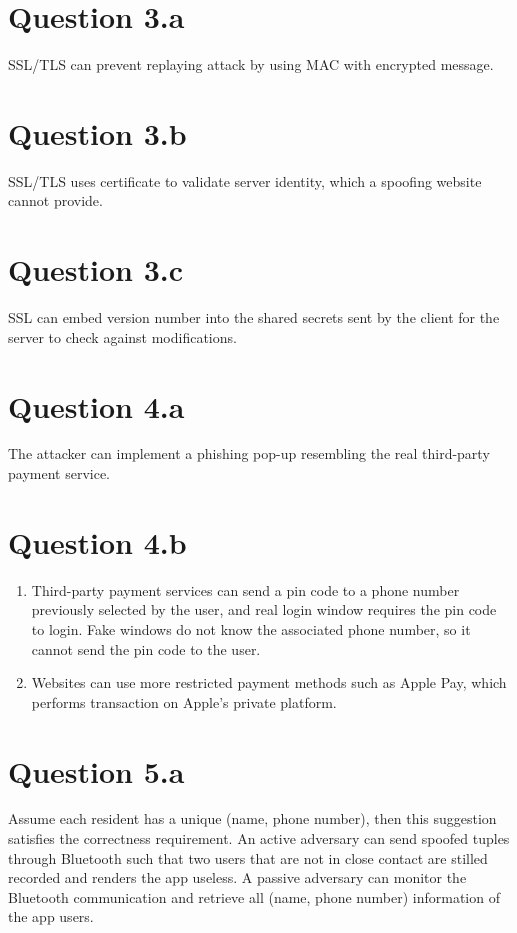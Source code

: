 \documentclass{article}
\begin{document}
\section{Question 3.a}
SSL/TLS can prevent replaying attack by using MAC with encrypted message.
\newpage

\section{Question 3.b}
SSL/TLS uses certificate to validate server identity, which a spoofing website cannot provide.
\newpage

\section{Question 3.c}
SSL can embed version number into the shared secrets sent by the client for the server to check against modifications.
\newpage

\section{Question 4.a}
The attacker can implement a phishing pop-up resembling the real third-party payment service.
\newpage

\section{Question 4.b}
\begin{enumerate}
    \item Third-party payment services can send a pin code to a phone number previously selected by the user, and real login window requires the pin code to login. Fake windows do not know the associated phone number, so it cannot send the pin code to the user.
    \item Websites can use more restricted payment methods such as Apple Pay, which performs transaction on Apple's private platform.
\end{enumerate}
\newpage

\section{Question 5.a}
Assume each resident has a unique (name, phone number), then this suggestion satisfies the correctness requirement.
An active adversary can send spoofed tuples through Bluetooth such that two users that are not in close contact are stilled recorded and renders the app useless. 
A passive adversary can monitor the Bluetooth communication and retrieve all (name, phone number) information of the app users.
\newpage
\end{document}
